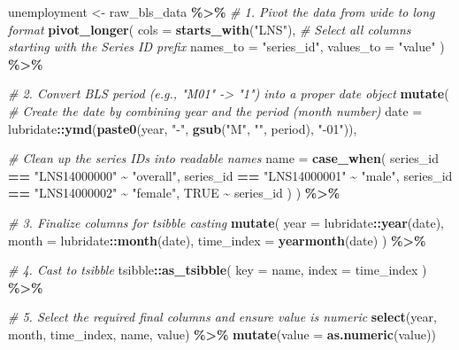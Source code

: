 \documentclass[
]{article}
\newenvironment{Shaded}{\begin{snugshade}}{\end{snugshade}}
\newcommand{\AttributeTok}[1]{\textcolor[rgb]{0.13,0.29,0.53}{#1}}
\newcommand{\CommentTok}[1]{\textcolor[rgb]{0.56,0.35,0.01}{\textit{#1}}}
\newcommand{\ConstantTok}[1]{\textcolor[rgb]{0.56,0.35,0.01}{#1}}
\newcommand{\FunctionTok}[1]{\textcolor[rgb]{0.13,0.29,0.53}{\textbf{#1}}}
\newcommand{\NormalTok}[1]{#1}
\newcommand{\OtherTok}[1]{\textcolor[rgb]{0.56,0.35,0.01}{#1}}
\newcommand{\SpecialCharTok}[1]{\textcolor[rgb]{0.81,0.36,0.00}{\textbf{#1}}}
\newcommand{\StringTok}[1]{\textcolor[rgb]{0.31,0.60,0.02}{#1}}
\begin{document}
\begin{Shaded}
\begin{Highlighting}[]
\NormalTok{unemployment }\OtherTok{\textless{}{-}}\NormalTok{ raw\_bls\_data }\SpecialCharTok{\%\textgreater{}\%}
  \CommentTok{\# 1. Pivot the data from wide to long format}
  \FunctionTok{pivot\_longer}\NormalTok{(}
    \AttributeTok{cols =} \FunctionTok{starts\_with}\NormalTok{(}\StringTok{"LNS"}\NormalTok{), }\CommentTok{\# Select all columns starting with the Series ID prefix}
    \AttributeTok{names\_to =} \StringTok{"series\_id"}\NormalTok{,}
    \AttributeTok{values\_to =} \StringTok{"value"}
\NormalTok{  ) }\SpecialCharTok{\%\textgreater{}\%}
  
  \CommentTok{\# 2. Convert BLS period (e.g., "M01" {-}\textgreater{} "1") into a proper date object}
  \FunctionTok{mutate}\NormalTok{(}
    \CommentTok{\# Create the date by combining year and the period (month number)}
    \AttributeTok{date =}\NormalTok{ lubridate}\SpecialCharTok{::}\FunctionTok{ymd}\NormalTok{(}\FunctionTok{paste0}\NormalTok{(year, }\StringTok{"{-}"}\NormalTok{, }\FunctionTok{gsub}\NormalTok{(}\StringTok{"M"}\NormalTok{, }\StringTok{""}\NormalTok{, period), }\StringTok{"{-}01"}\NormalTok{)),}
    
    \CommentTok{\# Clean up the series IDs into readable names}
    \AttributeTok{name =} \FunctionTok{case\_when}\NormalTok{(}
\NormalTok{      series\_id }\SpecialCharTok{==} \StringTok{"LNS14000000"} \SpecialCharTok{\textasciitilde{}} \StringTok{"overall"}\NormalTok{,}
\NormalTok{      series\_id }\SpecialCharTok{==} \StringTok{"LNS14000001"} \SpecialCharTok{\textasciitilde{}} \StringTok{"male"}\NormalTok{,}
\NormalTok{      series\_id }\SpecialCharTok{==} \StringTok{"LNS14000002"} \SpecialCharTok{\textasciitilde{}} \StringTok{"female"}\NormalTok{,}
      \ConstantTok{TRUE} \SpecialCharTok{\textasciitilde{}}\NormalTok{ series\_id}
\NormalTok{    )}
\NormalTok{  ) }\SpecialCharTok{\%\textgreater{}\%}
  
  \CommentTok{\# 3. Finalize columns for tsibble casting}
  \FunctionTok{mutate}\NormalTok{(}
    \AttributeTok{year =}\NormalTok{ lubridate}\SpecialCharTok{::}\FunctionTok{year}\NormalTok{(date),}
    \AttributeTok{month =}\NormalTok{ lubridate}\SpecialCharTok{::}\FunctionTok{month}\NormalTok{(date),}
    \AttributeTok{time\_index =} \FunctionTok{yearmonth}\NormalTok{(date)}
\NormalTok{  ) }\SpecialCharTok{\%\textgreater{}\%}
  
  \CommentTok{\# 4. Cast to tsibble}
\NormalTok{  tsibble}\SpecialCharTok{::}\FunctionTok{as\_tsibble}\NormalTok{(}
    \AttributeTok{key =}\NormalTok{ name,}
    \AttributeTok{index =}\NormalTok{ time\_index}
\NormalTok{  ) }\SpecialCharTok{\%\textgreater{}\%}
  
  \CommentTok{\# 5. Select the required final columns and ensure value is numeric}
  \FunctionTok{select}\NormalTok{(year, month, time\_index, name, value) }\SpecialCharTok{\%\textgreater{}\%}
  \FunctionTok{mutate}\NormalTok{(}\AttributeTok{value =} \FunctionTok{as.numeric}\NormalTok{(value))}
\end{Highlighting}
\end{Shaded}
\end{document}
